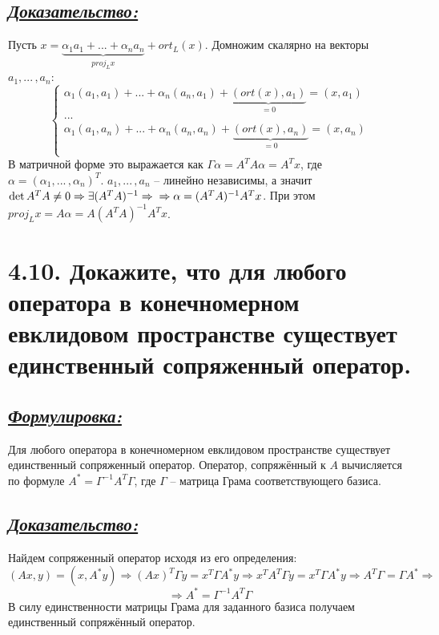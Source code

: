 \documentclass{article}
\begin{document}
\subsection*{\Large \underline{\textit{Доказательство: }}}
Пусть $x = \underbrace{\alpha_1a_1 + ... + \alpha_na_n}_{proj_L x} + ort_L(x)$. Домножим скалярно на векторы $a_1, ...\,, a_n$:
$$
\begin{cases}
\alpha_1(a_1, a_1) + ... + \alpha_n(a_n, a_1) + \underbrace{(ort(x), a_1)}_{= 0} = (x, a_1) \\
... \\
\alpha_1(a_1, a_n) + ... + \alpha_n(a_n, a_n) + \underbrace{(ort(x), a_n)}_{= 0}  = (x, a_n) \\
\end{cases}
$$
В матричной форме это выражается как $\Gamma \alpha = A^TA\alpha = A^Tx$, где $\alpha = (\alpha_1, ...\,, \alpha_n)^T$. $a_1, ...\,, a_n$ -- линейно независимы, а значит $\det{A^TA} \ne 0 \Rightarrow \exists (A^TA)^{-1} \Rightarrow 
\newline \Rightarrow \alpha = (A^TA)^{-1}A^Tx$. При этом $proj_L x = A\alpha = A(A^TA)^{-1}A^Tx$.

\section*{\LARGE 4.10. Докажите, что для любого оператора в конечномерном евклидовом пространстве существует единственный сопряженный оператор. }
\subsection*{\Large \underline{\textit{Формулировка: }}}
Для любого оператора в конечномерном евклидовом пространстве существует единственный сопряженный оператор. Оператор, сопряжённый к $A$ вычисляется по формуле $A^* = \Gamma^{-1}A^T\Gamma$, где $\Gamma$ -- матрица Грама соответствующего базиса.

\subsection*{\Large \underline{\textit{Доказательство: }}}
Найдем сопряженный оператор исходя из его определения:
$$
(Ax, y) = (x, A^*y) \Rightarrow (Ax)^T\Gamma y = x^T\Gamma A^* y \Rightarrow x^TA^T\Gamma y = x^T\Gamma A^* y \Rightarrow A^T\Gamma = \Gamma A^* \Rightarrow
$$
$$
\Rightarrow A^* = \Gamma^{-1} A^T \Gamma
$$
В силу единственности матрицы Грама для заданного базиса получаем единственный сопряжённый оператор.
\end{document}

